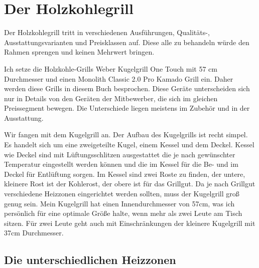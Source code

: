 
\section{Der Holzkohlegrill}

	Der Holzkohlegrill tritt in verschiedenen Ausführungen, Qualitäts-, 
	Ausstattungsvarianten und Preisklassen auf. 
	Diese alle zu behandeln würde den Rahmen sprengen und keinen Mehrwert 
	bringen.
	
	Ich setze die Holzkohle-Grills Weber Kugelgrill One Touch mit 57 cm 
	Durchmesser und einen Monolith Classic 2.0
	Pro Kamado Grill ein. Daher werden diese Grills in diesem Buch besprochen.
	Diese Geräte unterscheiden sich nur in Details von den Geräten der 
	Mitbewerber, die sich im gleichen Preissegment
	bewegen.  Die Unterschiede liegen meistens im Zubehör und in der 
	Ausstattung.
	
	Wir fangen mit dem Kugelgrill an. Der Aufbau des Kugelgrills ist recht simpel. 
	Es handelt sich um eine zweigeteilte
	Kugel, einem Kessel und dem Deckel. Kessel wie Deckel sind mit 
	Lüftungsschlitzen ausgestattet die je 
	nach gewünschter Temperatur eingestellt werden können und die im  Kessel 
	für die Be- und im Deckel für 
	Entlüftung sorgen. Im Kessel sind zwei Roste zu finden, der untere, kleinere 
	Rost ist der Kohlerost, der 
	obere ist für das Grillgut. Da je nach Grillgut verschiedene Heizzonen 
	eingerichtet werden sollten, muss der
	Kugelgrill groß genug sein. Mein Kugelgrill hat einen Innendurchmesser von 
	57cm, was ich persönlich für 
	eine optimale Größe halte, wenn mehr als zwei Leute am Tisch sitzen. Für zwei 
	Leute geht auch mit Einschränkungen der kleinere 
	Kugelgrill mit 37cm Durchmesser.

\subsection{Die unterschiedlichen Heizzonen} \label{Heizzonen}
	
